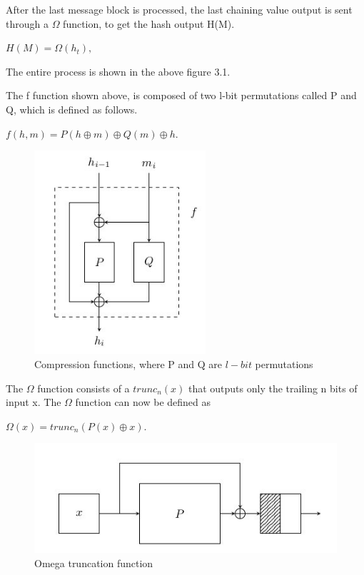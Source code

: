  After the last message block is processed, the last chaining value output is sent through a $\Omega$ function, to get
  the hash output H(M).
  \begin{center}$H(M) = \Omega(h_{t}),$\end{center}
  The entire process is shown in the above figure 3.1.

  The f function shown above, is composed of two l-bit permutations called P and Q, which is defined as follows.
  \begin{center}$f(h, m) = P(h \oplus m) \oplus Q(m) \oplus h.$\end{center}
  
  \begin{figure}[h]
    \begin{center}
      \includegraphics[width=2.5in]{groestlPQfunction.jpg}
    \end{center}
    \caption{Compression functions, where P and Q are $l-bit$ permutations \cite{00019}}
    \label{fig:lab}
  \end{figure}

  The $\Omega$ function consists of a $trunc_{n}(x)$ that outputs only the trailing n bits of input x. The $\Omega$ function
  can now be defined as 
  \begin{center}$\Omega(x) = trunc_{n}( P(x) \oplus x ).$\end{center}

  \begin{figure}[h]
    \begin{center}
      \includegraphics[width=4.5in]{groestlomegafunction.jpg}
    \end{center}
    \caption{Omega truncation function \cite{00019}}
    \label{fig:lab}
  \end{figure}

